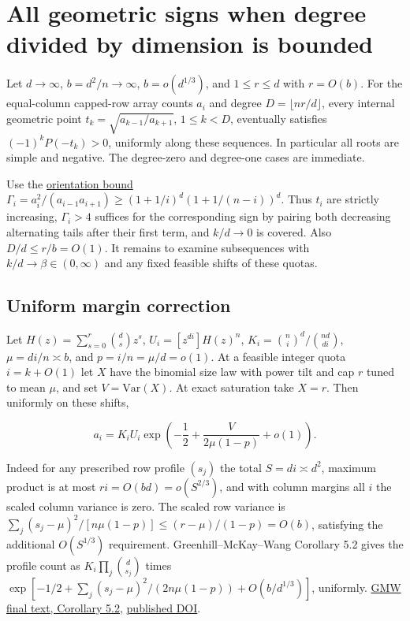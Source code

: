 \section{All geometric signs when degree divided by dimension is bounded}\label{sec:small-cap-bounded-degree-ratio}

Let $d\to\infty$, $b=d^2/n\to\infty$, $b=o(d^{1/3})$, and $1\le r\le d$ with $r=O(b)$. For the equal-column capped-row array counts $a_i$ and degree $D=\lfloor nr/d\rfloor$, every internal geometric point $t_k=\sqrt{a_{k-1}/a_{k+1}}$, $1\le k<D$, eventually satisfies $(-1)^kP(-t_k)>0$, uniformly along these sequences. In particular all roots are simple and negative. The degree-zero and degree-one cases are immediate.

Use the \href{https://github.com/ProgramComputer/open-math-research/blob/4fb624ba937a8eecc1361a6066185cd81ab7b172/topics/balanced-arrays/orientation-normalization.md}{orientation bound}
$\Gamma_i=a_i^2/(a_{i-1}a_{i+1})\ge(1+1/i)^d(1+1/(n-i))^d$. Thus $t_i$ are strictly increasing, $\Gamma_i>4$ suffices for the corresponding sign by pairing both decreasing alternating tails after their first term, and $k/d\to0$ is covered. Also $D/d\le r/b=O(1)$. It remains to examine subsequences with $k/d\to\beta\in(0,\infty)$ and any fixed feasible shifts of these quotas.

\subsection{Uniform margin correction}

Let $H(z)=\sum_{s=0}^r\binom ds z^s$, $U_i=[z^{di}]H(z)^n$, $K_i=\binom ni^d/\binom{nd}{di}$, $\mu=di/n\asymp b$, and $p=i/n=\mu/d=o(1)$. At a feasible integer quota $i=k+O(1)$ let $X$ have the binomial size law with power tilt and cap $r$ tuned to mean $\mu$, and set $V=\mathrm{Var}(X)$. At exact saturation take $X=r$. Then uniformly on these shifts,

\begin{equation}
a_i=K_i U_i\exp\!\left(-\frac12+\frac{V}{2\mu(1-p)}+o(1)\right).
\tag{L1}
\end{equation}

Indeed for any prescribed row profile $(s_j)$ the total $S=di\asymp d^2$, maximum product is at most $ri=O(bd)=o(S^{2/3})$, and with column margins all $i$ the scaled column variance is zero. The scaled row variance is $\sum_j(s_j-\mu)^2/[n\mu(1-p)]\le(r-\mu)/(1-p)=O(b)$, satisfying the additional $O(S^{1/3})$ requirement. Greenhill--McKay--Wang Corollary 5.2 gives the profile count as $K_i\prod_j\binom d{s_j}$ times $\exp[-1/2+\sum_j(s_j-\mu)^2/(2n\mu(1-p))+O(b/d^{1/3})]$, uniformly. \href{https://web.maths.unsw.edu.au/~csg/papers/irregular-final.pdf#page=33}{GMW final text, Corollary 5.2}, \href{https://doi.org/10.1016/j.jcta.2005.03.005}{published DOI}.

